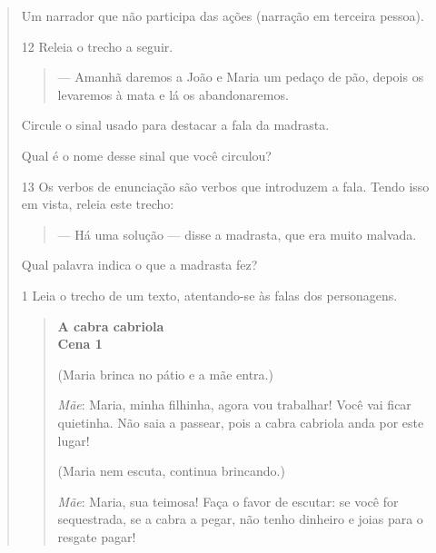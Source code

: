 \begin{boxlist}
\begin{quote}
\begin{boxlist}
\boxitem[X] Um narrador que não participa das ações (narração em terceira pessoa).
\end{boxlist}

\num{12} Releia o trecho a seguir.

\begin{quote}
--- Amanhã daremos a João e Maria um pedaço de pão, depois os
levaremos à mata e lá os abandonaremos.
\end{quote}

\begin{escolha}
\item Circule o sinal usado para destacar a fala da madrasta.

\item Qual é o nome desse sinal que você circulou?

\end{escolha}

\num{13} Os verbos de enunciação são verbos que introduzem a fala. Tendo isso em
vista, releia este trecho:

\begin{quote}
--- Há uma solução --- disse a madrasta, que era muito malvada.
\end{quote}


Qual palavra indica o que a madrasta fez?



\num{1} Leia o trecho de um texto, atentando-se às falas dos personagens.

\begin{quote}
\textbf{A cabra cabriola}\\
\textbf{Cena 1}

(Maria brinca no pátio e a mãe entra.)

\emph{Mãe}: Maria, minha filhinha, agora vou trabalhar! Você vai ficar
quietinha. Não saia a passear, pois a cabra cabriola anda por este
lugar!

(Maria nem escuta, continua brincando.)

\emph{Mãe}: Maria, sua teimosa! Faça o favor de escutar: se você for
sequestrada, se a cabra a pegar, não tenho dinheiro e joias para o
resgate pagar!


\end{quote}
\end{quote}
\end{boxlist}
